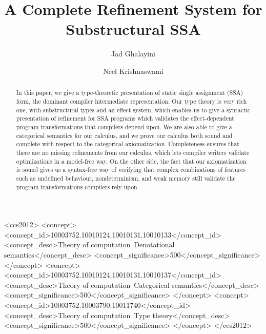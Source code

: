 \documentclass[acmsmall,screen,review]{acmart}
\begin{document}
\title{A Complete Refinement System for Substructural SSA}

\author{Jad Ghalayini}

\author{Neel Krishnaswami}

\begin{abstract}
  In this paper, we give a type-theoretic presentation of static single assignment (SSA) form, the
  dominant compiler intermediate representation. Our type theory is very rich one, with
  substructural types and an effect system, which enables us to give a syntactic presentation of
  refinement for SSA programs which validates the effect-dependent program transformations that
  compilers depend upon. We are also able to give a categorical semantics for our calculus, and we
  prove our calculus both sound and complete with respect to the categorical axiomatization.
  Completeness ensures that there are no missing refinements from our calculus, which lets compiler
  writers validate optimizations in a model-free way. On the other side, the fact that our
  axiomatization is sound gives us a syntax-free way of verifying that complex combinations of
  features such as undefined behaviour, nondeterminism, and weak memory still validate the program
  transformations compilers rely upon. 
\end{abstract}

\begin{CCSXML}
  <ccs2012>
  <concept>
  <concept_id>10003752.10010124.10010131.10010133</concept_id>
  <concept_desc>Theory of computation~Denotational semantics</concept_desc>
  <concept_significance>500</concept_significance>
  </concept>
  <concept>
  <concept_id>10003752.10010124.10010131.10010137</concept_id>
  <concept_desc>Theory of computation~Categorical semantics</concept_desc>
  <concept_significance>500</concept_significance>
  </concept>
  <concept>
  <concept_id>10003752.10003790.10011740</concept_id>
  <concept_desc>Theory of computation~Type theory</concept_desc>
  <concept_significance>500</concept_significance>
  </concept>
  </ccs2012>
\end{CCSXML}


\end{document}
